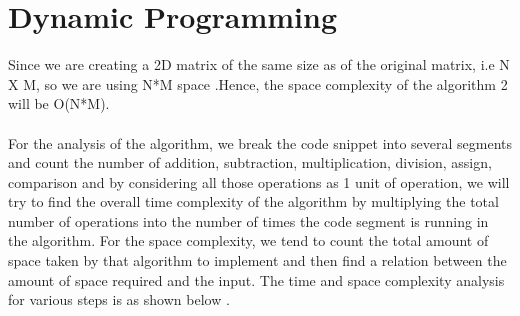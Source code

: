 \documentclass[conference]{IEEEtran}
\begin{document}
\section*{Dynamic Programming}


Since we are creating a 2D matrix of the same size as of the original matrix, i.e N X M, so we are using N*M space .Hence, the space complexity of the algorithm 2 will be O(N*M).\\\\

For the analysis of the algorithm, we break the code snippet into several segments and count the number of addition, subtraction, multiplication, division, assign, comparison and by considering all those operations as 1 unit of operation, we will try to find the overall time complexity of the algorithm by multiplying the total  number of operations into the number of times the code segment is running in the algorithm. For the space complexity, we tend to count the total amount of space taken by that algorithm to implement and then find a relation between the amount of space required and the input. The time and space complexity analysis for various steps is as shown below .\\

\bigskip
\end{document}
